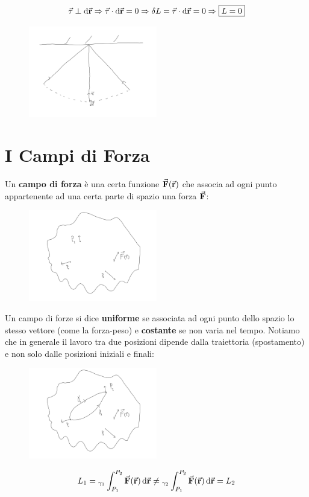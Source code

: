 \documentclass{report}
\newcommand{\then}{\ensuremath{\Rightarrow}}
\renewcommand{\r}{\va{r}}
\newcommand{\F}{\va{F}}
\begin{document}
\begin{equation}
    \va{\tau}\perp\dif\r\then\va{\tau}\cdot\dif\r=0\then \delta L=\va{\tau}\cdot\dif\r=0\then \boxed{L=0}
\end{equation}
\begin{figure}[H]
    \centering
    \includegraphics[width=0.5\textwidth]{LavoroIntLinea.png}
\end{figure}

\section{I Campi di Forza}
Un \textbf{campo di forza} è una certa funzione $\F(\r)$ che associa ad ogni punto appartenente ad una certa parte di spazio una forza $\F$:
\begin{figure}[H]
    \centering
    \includegraphics[width=0.5\textwidth]{CampodiForze.png}
\end{figure}
Un campo di forze si dice \textbf{uniforme} se associata ad ogni punto dello spazio lo stesso vettore (come la forza-peso) e \textbf{costante} se non varia nel tempo. Notiamo che in generale il lavoro tra due posizioni dipende dalla traiettoria (spostamento) e non solo dalle posizioni iniziali e finali:
\begin{figure}[H]
    \centering
    \includegraphics[width=0.5\textwidth]{TraiettorieCampiForza.png}
\end{figure}
\[L_1={}_{\gamma_1}\int_{P_1}^{P_2}\F(\r)\dif\r\neq{}_{\gamma_2}\int_{P_1}^{P_2}\F(\r)\dif\r=L_2\]
\end{document}
